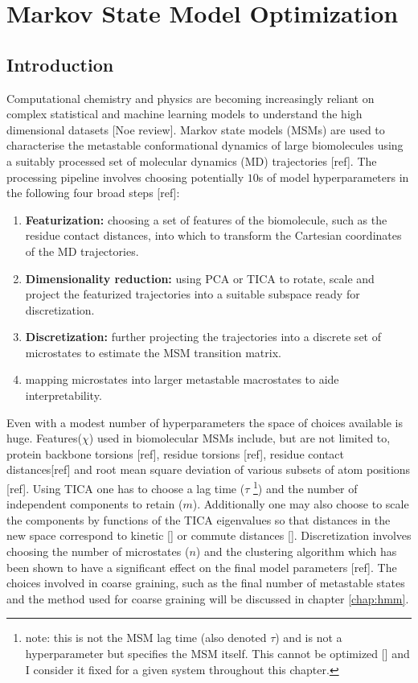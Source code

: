 \let\textcircled=\pgftextcircled
\chapter{Markov State Model Optimization}
\label{chap:msm}

\section{Introduction}
Computational chemistry and physics are becoming increasingly reliant on complex statistical and machine learning models to understand the high dimensional datasets [Noe review]. Markov state models (MSMs) are used to characterise the metastable conformational dynamics of large biomolecules using a suitably processed set of molecular dynamics (MD) trajectories [ref]. The processing pipeline involves choosing potentially $10$s of model hyperparameters in the following four broad steps [ref]:

\begin{enumerate}
    \item \textbf{Featurization:} choosing a set of features of the biomolecule, such as the residue contact distances, into which to transform the Cartesian coordinates of the MD trajectories. 
    \item \textbf{Dimensionality reduction:} using PCA or TICA  to rotate, scale and project the featurized trajectories into a suitable subspace ready for discretization.  
    \item \textbf{Discretization:} further projecting the trajectories into a discrete set of microstates to estimate the MSM transition matrix. 
    \item {} mapping microstates into larger metastable macrostates to aide interpretability.   
\end{enumerate}

Even with a modest number of hyperparameters the space of choices available is huge.  Features($\chi$) used in biomolecular MSMs include, but are not limited to, protein backbone torsions [ref], residue torsions [ref], residue contact distances[ref] and root mean square deviation of various subsets of atom positions [ref]. Using TICA one has to choose a lag time ($\tau$ \footnote{note: this is not the MSM lag time (also denoted $\tau$) and is not a hyperparameter but specifies the MSM itself. This cannot be optimized [] and I consider it fixed for a given system throughout this chapter.}) and the number of independent components to retain ($m$). Additionally one may also choose to scale the components by functions of the TICA eigenvalues so that distances in the new space correspond to kinetic [] or commute distances []. Discretization involves choosing the number of microstates ($n$) and the clustering algorithm which has been shown to have a significant effect on the final model parameters [ref].  The choices involved in coarse graining, such as the final number of metastable states and the method used for coarse graining will be discussed in chapter \ref{chap:hmm}. 

